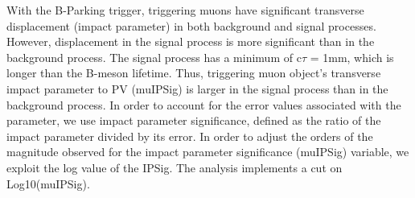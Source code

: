 With the B-Parking trigger, triggering muons have significant transverse displacement (impact parameter) in both background and signal processes.
However, displacement in the signal process is more significant than in the background process.
The signal process has a minimum of c$\tau$ = 1mm, which is longer than the B-meson lifetime.
Thus, triggering muon object's transverse impact parameter to PV (muIPSig) is larger in the signal process than in the background process.
In order to account for the error values associated with the parameter, we use impact parameter significance, defined as the ratio of the impact parameter divided by its error.
In order to adjust the orders of the magnitude observed for the impact parameter significance (muIPSig) variable, we exploit the log value of the IPSig.
The analysis implements a cut on Log10(muIPSig).


